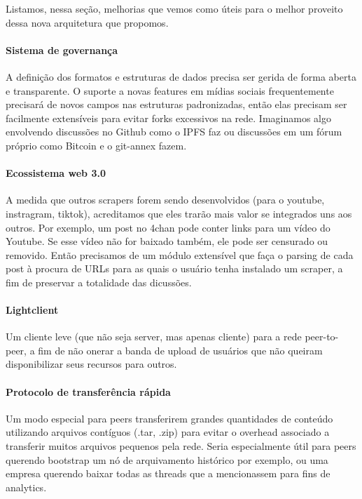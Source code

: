 Listamos, nessa seção, melhorias que vemos como úteis para o melhor proveito dessa nova arquitetura que propomos.

\paragraph{Sistema de governança}

A definição dos formatos e estruturas de dados precisa ser gerida de forma aberta e transparente.
O suporte a novas features em mídias sociais frequentemente precisará de novos campos nas estruturas padronizadas, então elas precisam ser facilmente extensíveis para evitar forks excessivos na rede.
Imaginamos algo envolvendo discussões no Github como o IPFS faz ou discussões em um fórum próprio como Bitcoin e o git-annex fazem.

\paragraph{Ecossistema web 3.0}

A medida que outros scrapers forem sendo desenvolvidos (para o youtube, instragram, tiktok), acreditamos que eles trarão mais valor se integrados uns aos outros.
Por exemplo, um post no 4chan pode conter links para um vídeo do Youtube.
Se esse vídeo não for baixado também, ele pode ser censurado ou removido.
Então precisamos de um módulo extensível que faça o parsing de cada post à procura de URLs para as quais o usuário tenha instalado um scraper, a fim de preservar a totalidade das dicussões.

\paragraph{Lightclient}

Um cliente leve (que não seja server, mas apenas cliente) para a rede peer-to-peer, a fim de não onerar a banda de upload de usuários que não queiram disponibilizar seus recursos para outros.

\paragraph{Protocolo de transferência rápida}

Um modo especial para peers transferirem grandes quantidades de conteúdo utilizando arquivos contíguos (.tar, .zip) para evitar o overhead associado a transferir muitos arquivos pequenos pela rede.
Seria especialmente útil para peers querendo bootstrap um nó de arquivamento histórico por exemplo, ou uma empresa querendo baixar todas as threads que a mencionassem para fins de analytics.

